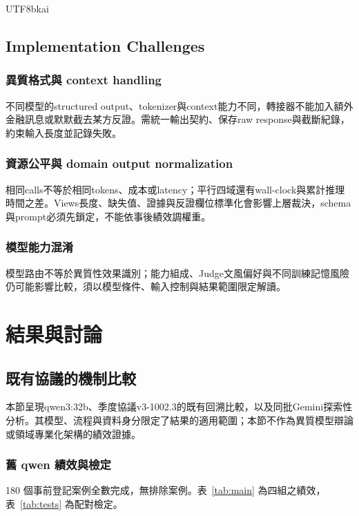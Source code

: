 \documentclass[12pt,a4paper]{article}
\begin{document}
\begin{CJK}{UTF8}{bkai}
\subsection{Implementation Challenges}

\subsubsection{異質格式與 context handling}
不同模型的structured output、tokenizer與context能力不同，轉接器不能加入額外金融訊息或默默截去某方反證。需統一輸出契約、保存raw response與截斷紀錄，約束輸入長度並記錄失敗。

\subsubsection{資源公平與 domain output normalization}
相同calls不等於相同tokens、成本或latency；平行四域還有wall-clock與累計推理時間之差。Views長度、缺失值、證據與反證欄位標準化會影響上層裁決，schema與prompt必須先鎖定，不能依事後績效調權重。

\subsubsection{模型能力混淆}
模型路由不等於異質性效果識別；能力組成、Judge文風偏好與不同訓練記憶風險仍可能影響比較，須以模型條件、輸入控制與結果範圍限定解讀。

\section{結果與討論}
\subsection{既有協議的機制比較}
本節呈現qwen3:32b、季度協議v3-1002.3的既有回溯比較，以及同批Gemini探索性分析。其模型、流程與資料身分限定了結果的適用範圍；本節不作為異質模型辯論或領域專業化架構的績效證據。


\subsubsection{舊 qwen 績效與檢定}
180 個事前登記案例全數完成，無排除案例。表~\ref{tab:main} 為四組之績效，表~\ref{tab:tests} 為配對檢定。


\end{CJK}
\end{document}
